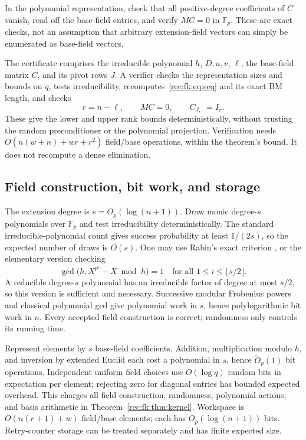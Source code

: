 \documentclass[11pt]{article}
\theoremstyle{definition}
\theoremstyle{remark}
\newcommand{\1}{\mathbf 1}
\providecommand{\F}{\mathbb F}
\begin{document}
In the polynomial representation, check that all positive-degree
coefficients of $C$ vanish, read off the base-field entries, and
verify $MC=0$ in $\F_p$. These are exact checks, not an assumption
that arbitrary extension-field vectors can simply be enumerated as
base-field vectors.

The certificate comprises the irreducible polynomial $h$, $D,u,v$,
$\ell$, the base-field matrix $C$, and its pivot rows $J$.
A verifier checks the representation sizes and bounds on $q$, tests
irreducibility, recomputes~\eqref{rec:fk:eq:seq} and its exact BM length,
and checks
\[
 r=n-\ell,\qquad MC=0,\qquad C_{J,:}=I_r.
\]
These give the lower and upper rank bounds deterministically, without
trusting the random preconditioner or the polynomial projection.
Verification needs $O(n(w+n)+wr+r^2)$ field/base operations, within
the theorem's bound. It does not recompute a dense elimination.

\subsection{Field construction, bit work, and storage}
The extension degree is $s=O_p(\log(n+1))$. Draw monic degree-$s$
polynomials over $\F_p$ and test irreducibility deterministically.
The standard irreducible-polynomial count gives success probability
at least $1/(2s)$, so the expected number of draws is $O(s)$.
One may use Rabin's exact criterion \cite{rec:Rabin}, or the elementary
version checking
\[
 \gcd\bigl(h,X^{p^i}-X\bmod h\bigr)=1
 \quad\text{for all }1\le i\le\lfloor s/2\rfloor.
\]
A reducible degree-$s$ polynomial has an irreducible factor of degree
at most $s/2$, so this version is sufficient and necessary.
Successive modular Frobenius powers and classical polynomial gcd
give polynomial work in $s$, hence polylogarithmic bit work in $n$.
Every accepted field construction is correct; randomness only
controls its running time.

Represent elements by $s$ base-field coefficients. Addition,
multiplication modulo $h$, and inversion by extended Euclid each
cost a polynomial in $s$, hence $\widetilde O_p(1)$ bit operations.
Independent uniform field choices use $O(\log q)$ random bits in
expectation per element; rejecting zero for diagonal entries has
bounded expected overhead. This charges all field construction,
randomness, polynomial actions, and basis arithmetic in
Theorem~\ref{rec:fk:thm:kernel}. Workspace is $O(n(r+1)+w)$ field/base
elements; each has $O_p(\log(n+1))$ bits. Retry-counter storage can
be treated separately and has finite expected size.
\end{document}
